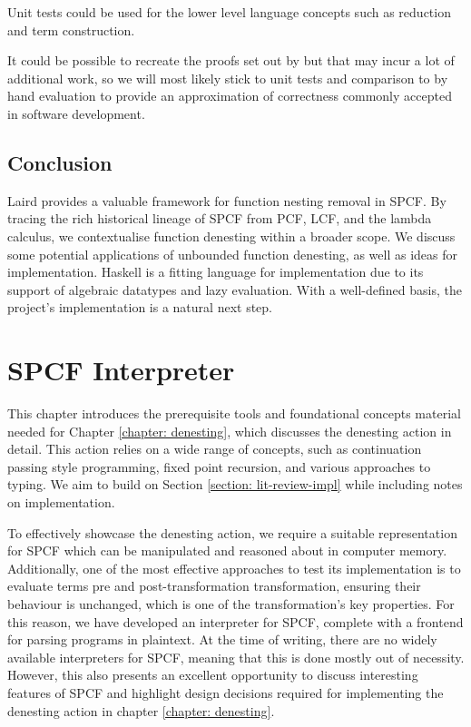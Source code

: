 \documentclass[12pt,a4paper]{report}
\theoremstyle{definition}
\theoremstyle{remark}
\begin{document}
Unit tests could be used for the lower level language concepts such as reduction and term construction.

It could be possible to recreate the proofs set out by \cite{laird_2007} but that may incur a lot of additional work, so we will most likely stick to unit tests and comparison to by hand evaluation to provide an approximation of correctness commonly accepted in software development.

\section{Conclusion}
Laird provides a valuable framework for function nesting removal in SPCF. By tracing the rich historical lineage of SPCF from PCF, LCF, and the lambda calculus, we contextualise function denesting within a broader scope. We discuss some potential applications of unbounded function denesting, as well as ideas for implementation. Haskell is a fitting language for implementation due to its support of algebraic datatypes and lazy evaluation. With a well-defined basis, the project's implementation is a natural next step.

\chapter{SPCF Interpreter}\label{chapter: interpreter}
This chapter introduces the prerequisite tools and foundational concepts material needed for Chapter \ref{chapter: denesting}, which discusses the denesting action in detail. This action relies on a wide range of concepts, such as continuation passing style programming, fixed point recursion, and various approaches to typing. We aim to build on Section \ref{section: lit-review-impl} while including notes on implementation.

To effectively showcase the denesting action, we require a suitable representation for SPCF which can be manipulated and reasoned about in computer memory. Additionally, one of the most effective approaches to test its implementation is to evaluate terms pre and post-transformation transformation, ensuring their behaviour is unchanged, which is one of the transformation's key properties. For this reason, we have developed an interpreter for SPCF, complete with a frontend for parsing programs in plaintext. At the time of writing, there are no widely available interpreters for SPCF, meaning that this is done mostly out of necessity. However, this also presents an excellent opportunity to discuss interesting features of SPCF and highlight design decisions required for implementing the denesting action in chapter  \ref{chapter: denesting}.
\end{document}
